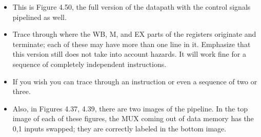 \setlength{\columnseprule}{1pt}
\def\columnseprulecolor{\color{blue}}

\begin{frame}[fragile]
\BNotes\ifnum{}
\begin{itemize}
\item This is Figure 4.50, the full version of the datapath with the 
	control signals pipelined as well. 
\item Trace through where the WB, M, and 
	EX parts of the registers originate and terminate; each of these may 
	have more than one line in it. Emphasize that this version still does 
	not take into account hazards. It will work fine for a sequence of 
	completely independent instructions. 
\item If you wish you can trace 
	through an instruction or even a sequence 
	of two or three.
\item Also, in Figures 4.37, 4.39, there are two
	images of the pipeline.  In the top image of each of these figures,
	the MUX coming out of data memory has the 0,1 inputs swapped; they
	are correctly labeled in the bottom image.
\end{itemize}
\fi\ENotes
\end{frame}


